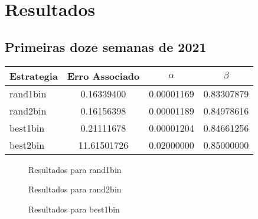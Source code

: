 \documentclass[]{article}
\begin{document}
\section{Resultados}
\subsection{Primeiras doze semanas de 2021}

\begin{table}[h!]
	\centering
	\begin{tabular}{l c | c c}
		\toprule
		Estrategia & Erro Associado & $\alpha$ & $\beta$ \\
		\hline
		rand1bin & 0.16339400  & 0.00001169 & 0.83307879 \\
		rand2bin & 0.16156398  & 0.00001189 & 0.84978616 \\
		best1bin & 0.21111678  & 0.00001204	& 0.84661256 \\		
		best2bin & 11.61501726 & 0.02000000 & 0.85000000 \\
		\bottomrule
		
	\end{tabular}
\end{table}

\begin{figure}[h!]
	\centering
	
	
	\caption{Resultados para rand1bin}
	\label{res01}
\end{figure}

\begin{figure}[h!]
	\centering
	
		
	\caption{Resultados para rand2bin}
	\label{res02}
\end{figure}

\begin{figure}[h!]
	\centering
	
	
	\caption{Resultados para best1bin}
	\label{res03}
\end{figure}
\end{document}
